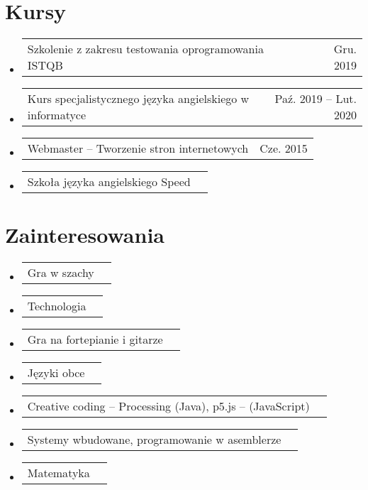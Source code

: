 \documentclass[A4,11pt]{article}
\makeatletter
\newcommand{\CVSubSubheading}[2]{
  \item
    \begin{tabular*}{0.97\textwidth}{l@{\extracolsep{\fill}}r}
      \small#1 & \small #2 \\
    \end{tabular*}\vspace{-4pt}
}
\newcommand{\CVSubHeadingListStart}{\begin{itemize}[leftmargin=0.5cm, label={}]}
\newcommand{\CVSubHeadingListEnd}{\end{itemize}}
\makeatother
\begin{document}
\section{Kursy}
  \CVSubHeadingListStart
    \CVSubSubheading{Szkolenie z zakresu testowania oprogramowania ISTQB}{Gru. 2019}
    \CVSubSubheading{Kurs specjalistycznego języka angielskiego w informatyce}{Paź. 2019 -- Lut. 2020}
    \CVSubSubheading{Webmaster -- Tworzenie stron internetowych}{Cze. 2015}
    \CVSubSubheading{Szkoła języka angielskiego Speed}{}
  \CVSubHeadingListEnd
\section{Zainteresowania}
  \CVSubHeadingListStart
    \CVSubSubheading{Gra w szachy}{}
    \CVSubSubheading{Technologia}{}
    \CVSubSubheading{Gra na fortepianie i gitarze}{}
    \CVSubSubheading{Języki obce}{}
    \CVSubSubheading{Creative coding -- Processing (Java), p5.js -- (JavaScript)}{}
    \CVSubSubheading{Systemy wbudowane, programowanie w asemblerze}{}
    \CVSubSubheading{Matematyka}{}
  \CVSubHeadingListEnd
\end{document}
